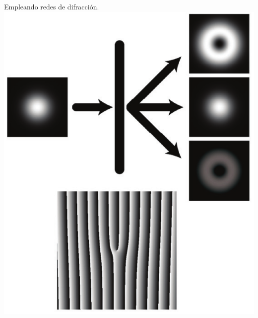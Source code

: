 \documentclass[serif,8pt]{beamer}
\begin{document}
\begin{frame}
\begin{multicols}{3}
			\newpage 
			\vfill
			\centering Empleando redes de difracción\footnotemark[1].
			\includegraphics[scale=0.25]{img/DiffGrat.eps}
		\end{multicols}
		
		\end{frame}	

\end{document}
